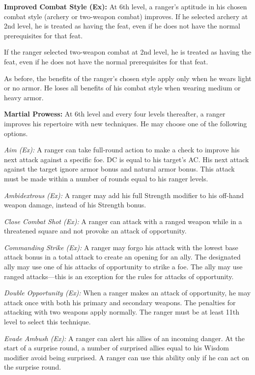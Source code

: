 \textbf{Improved Combat Style (Ex):} At 6th level, a ranger's aptitude in his chosen combat style (archery or two-weapon combat) improves. If he selected archery at 2nd level, he is treated as having the  feat, even if he does not have the normal prerequisites for that feat.

If the ranger selected two-weapon combat at 2nd level, he is treated as having the  feat, even if he does not have the normal prerequisites for that feat.

As before, the benefits of the ranger's chosen style apply only when he wears light or no armor. He loses all benefits of his combat style when wearing medium or heavy armor.


\textbf{Martial Prowess:} At 6th level and every four levels thereafter, a ranger improves his repertoire with new techniques. He may choose one of the following options.

\textit{Aim (Ex):} A ranger can take full-round action to make a  check to improve his next attack against a specific foe. DC is equal to his target's AC. His next attack against the target ignore armor bonus and natural armor bonus. This attack must be made within a number of rounds equal to \onequarter his ranger levels.

\textit{Ambidextrous (Ex):} A ranger may add his full Strength modifier to his off-hand weapon damage, instead of \onehalf his Strength bonus.

\textit{Close Combat Shot (Ex):} A ranger can attack with a ranged weapon while in a threatened square and not provoke an attack of opportunity.

\textit{Commanding Strike (Ex):} A ranger may forgo his attack with the lowest base attack bonus in a total attack to create an opening for an ally. The designated ally may use one of his attacks of opportunity to strike a foe. The ally may use ranged attacks---this is an exception for the rules for attacks of opportunity.

\textit{Double Opportunity (Ex):} When a ranger makes an attack of opportunity, he may attack once with both his primary and secondary weapons. The penalties for attacking with two weapons apply normally. The ranger must be at least 11th level to select this technique.

\textit{Evade Ambush (Ex):} A ranger can alert his allies of an incoming danger. At the start of a surprise round, a number of surprised allies equal to his Wisdom modifier avoid being surprised. A ranger can use this ability only if he can act on the surprise round.

